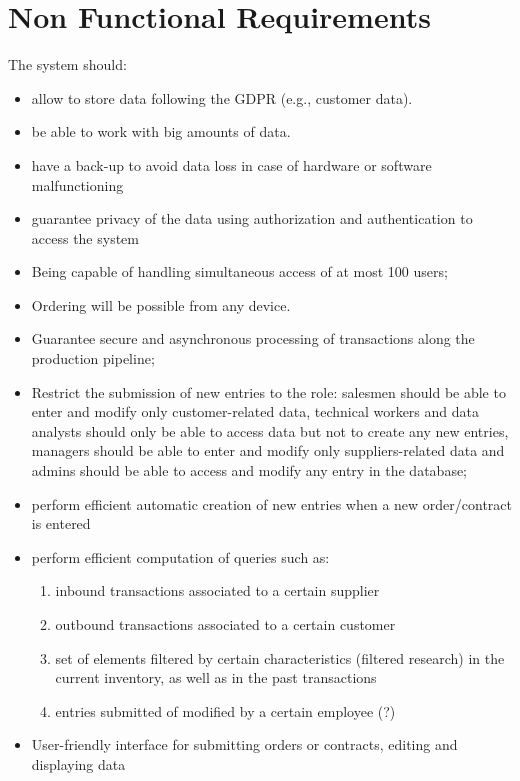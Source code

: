 \section{Non Functional Requirements}
The system should:
\begin{itemize}
    \item allow to store data following the GDPR (e.g., customer data).
    \item be able to work with big amounts of data.
    \item have a back-up to avoid data loss in case of hardware or software malfunctioning
    \item guarantee privacy of the data using authorization and authentication to access the system
    \item Being capable of handling simultaneous access of at most 100 users;
    \item Ordering will be possible from any device.
    \item Guarantee secure and asynchronous processing of transactions along the production pipeline;
    \item Restrict the submission of new entries to the role: salesmen should be able to enter and modify only customer-related data, technical workers and data analysts should only be able to access data but not to create any new entries, managers should be able to enter and modify only suppliers-related data and admins should be able to access and modify any entry in the database;
    \item perform efficient automatic creation of new entries when a new order/contract is entered 
    \item perform efficient computation of queries such as:
    \begin{enumerate}
	    \item inbound transactions associated to a certain supplier
	    \item outbound transactions associated to a certain customer
	    \item set of elements filtered by certain characteristics (filtered research) in the current inventory, as well as in the past transactions
   		\item entries submitted of modified by a certain employee (?)
    \end{enumerate}
    \item User-friendly interface for submitting orders or contracts, editing and displaying data
\end{itemize}

